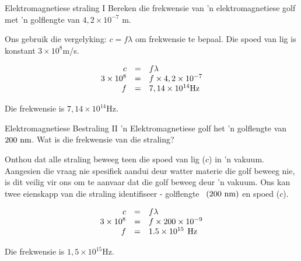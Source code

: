 \begin{wex}{E\-lek\-tro\-mag\-ne\-tie\-se straling I}{
Bereken die frekwensie van 'n elektromagnetiese golf met 'n golflengte van $4,2\ensuremath{\times}{10}^{-7}$ m.}
{ 
Ons gebruik die vergelyking: $c=f\lambda $ om frekwensie te bepaal. Die spoed van lig is konstant $3\ensuremath{\times}{10}^{8}$m/s.\par 

\begin{equation}
    \begin{array}{ccl}\hfill c& =& f\lambda \hfill \\ \hfill 3\ensuremath{\times}{10}^{8}& =& f\ensuremath{\times}4,2\ensuremath{\times}{10}^{-7}\hfill \\ \hfill f& =& 7,14\ensuremath{\times}{10}^{14}\text{Hz}\hfill \end{array}
\end{equation}



Die frekwensie is $7,14\times10^{14}$Hz.

}
\end{wex}
 
\begin{wex}{E\-lek\-tro\-mag\-ne\-tie\-se Bestraling II}{
'n Elektromagnetiese golf het 'n golflengte van $200\phantom{\rule{3.33333pt}{0ex}}\text{nm}$. Wat is die frekwensie van die straling?}{

Onthou dat alle straling beweeg teen die spoed van lig ($c$) in 'n vakuum.
Aangesien die vraag nie spesifiek aandui deur watter materie die golf beweeg nie, is dit veilig vir ons om te aanvaar dat die golf beweeg deur 'n vakuum. 
Ons kan twee eienskapp van die straling identifiseer - golflengte $\phantom{\rule{3.33333pt}{0ex}}\left(200\phantom{\rule{3.33333pt}{0ex}}\text{nm}\right)$ en spoed ($c$).\par 

\begin{equation}
    \begin{array}{ccc}\hfill c& =& f\lambda \hfill \\ \hfill 3\ensuremath{\times}{10}^{8}& =& f\ensuremath{\times}200\ensuremath{\times}{10}^{-9}\hfill \\ \hfill f& =& 1.5\ensuremath{\times}{10}^{15}\phantom{\rule{4pt}{0ex}}\text{Hz}\hfill \end{array}
\end{equation}


Die frekwensie is $1,5\times10^{15}$Hz.
}
\end{wex}

